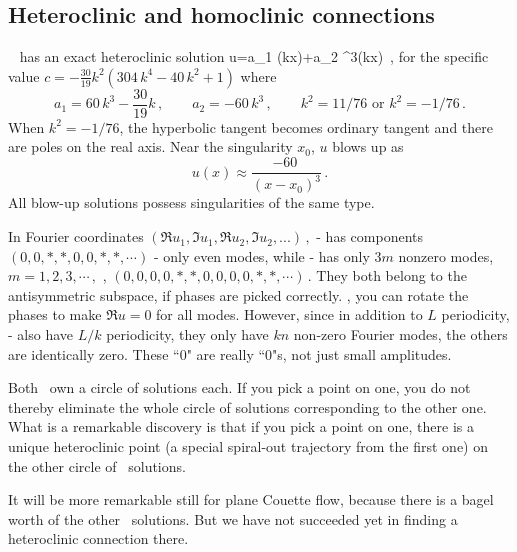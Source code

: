 \subsection{Heteroclinic and homoclinic connections}
%

\KSe\  has an exact heteroclinic solution
\beq
u=a_1 \tanh(kx)+a_2 \tanh^3(kx)
\label{eq:ksexa} 
\,,
\eeq
for the specific value $c=-\frac{30}{19}k^2(304\,k^4-40\,k^2+1)$ where 
\[
a_1=60\,k^3-\frac{30}{19}k
    \,,\qquad
a_2=-60\,k^3
    \,,\qquad
k^2=11/76 \mbox{ or } 
k^2=-1/76
\,.
\]
When $k^2=-1/76$, the hyperbolic tangent becomes ordinary tangent and there are poles on
the real axis. Near the singularity $x_0$, $u$ blows up as
\[
u(x) \approx \frac{-60~}{(x-x_0)^3}
\,.
\]
All blow-up solutions possess singularities of the same type.

In Fourier coordinates 
\(
(\Re u_1, \Im u_1, \Re u_2, \Im u_2, ...)
\,,
\)
 -{\eqv} 
 has components \(
(0, 0, *, *, 0, 0, *, *,\cdots)
\) - only even modes, while -{\eqv}
has only $3m$ nonzero modes, 
\(
m = 1, 2, 3, \cdots\,,
\)
\ie,
\(
(0,0,0,0,*,*,0,0,0,0,*,*,\cdots)
\,.
\)  
They both belong to the antisymmetric subspace, if phases are picked
correctly.  
\ie,
you can rotate the phases to make 
\( \Re u = 0 \)
for all modes. However,
since in addition to 
$L$ periodicity, -{\eqv} also have
$L/k$ periodicity, they only have 
$kn$ non-zero Fourier modes, the others are identically zero.
These ``0" are
really ``0"s, not just small amplitudes.

Both \eqva\ own a circle of solutions
each. If you pick a point on one, you do not thereby eliminate the whole
circle of solutions corresponding to the other one. What is a remarkable
discovery is that if you pick a point on one, there is a
unique heteroclinic point (a special spiral-out trajectory from the first
one) on the other circle of \eqv\ solutions.

It will be more remarkable still for plane Couette flow, because there
is a bagel worth of the other \eqv\ solutions. But we have not
succeeded yet in finding a heteroclinic connection there.


